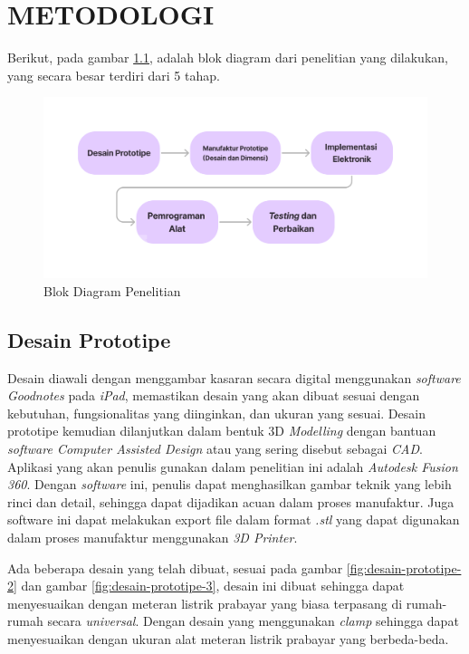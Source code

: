 \chapter{METODOLOGI}

Berikut, pada gambar \ref{fig:blok-diagram}, adalah blok diagram dari penelitian yang dilakukan, 
yang secara besar terdiri dari 5 tahap.

\begin{figure}[H]
    \centering
    \includegraphics[width=1\linewidth]{gambar/diagram-metodologi.png}
    \caption{Blok Diagram Penelitian}
    \label{fig:blok-diagram}
\end{figure}

\section{Desain Prototipe}

Desain diawali dengan menggambar kasaran secara digital menggunakan \textit{software Goodnotes}
pada \textit{iPad}, memastikan desain yang akan dibuat sesuai dengan kebutuhan, fungsionalitas yang diinginkan,
dan ukuran yang sesuai.
Desain prototipe kemudian dilanjutkan dalam bentuk 3D \textit{Modelling} dengan 
bantuan \textit{software Computer Assisted Design} atau yang sering disebut 
sebagai \textit{CAD}. Aplikasi yang akan penulis gunakan dalam penelitian ini 
adalah \textit{Autodesk Fusion 360}. Dengan \textit{software} ini, penulis dapat menghasilkan gambar
teknik yang lebih rinci dan detail, sehingga dapat dijadikan acuan dalam proses manufaktur.
Juga software ini dapat melakukan export file dalam format \textit{.stl} yang dapat digunakan
dalam proses manufaktur menggunakan \textit{3D Printer}.

Ada beberapa desain yang telah dibuat, sesuai pada gambar \ref{fig:desain-prototipe-2} dan gambar 
\ref{fig:desain-prototipe-3}, desain ini dibuat sehingga dapat 
menyesuaikan dengan meteran listrik prabayar yang biasa terpasang di rumah-rumah secara 
\textit{universal}. Dengan desain yang menggunakan \textit{clamp} sehingga dapat menyesuaikan dengan
ukuran alat meteran listrik prabayar yang berbeda-beda.

